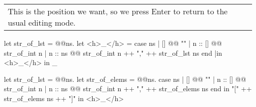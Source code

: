 \documentclass[runningheads]{llncs}
\begin{document}
	\begin{tabular}{|p{\linewidth}}
	This is the position we want, so we press Enter to return to
	the usual editing mode.
	\end{tabular}
\begin{hazel}
let str_of_lst = 
	@\lam @ns.{
		let <h>_</h> =
			case ns
			| []      @\casearrow @ ""
			| n :: [] @\casearrow @ str_of_int n		
			| n :: ns @\casearrow @ str_of_int n ++ "," ++ str_of_lst ns
			end
		|in
		<h>_</h>
	}
in
_
\end{hazel}

\begin{hazel}
let str_of_lst =
	@\lam @ns.{
		let str_of_elems = 
			@\lam @ns.{
				case ns
				| []      @\casearrow @ ""                                     
				| n :: [] @\casearrow @ str_of_int n                           
				| n :: ns @\casearrow @ str_of_int n ++ "," ++ str_of_elems ns 
				end
			}
		in
		"[" ++ str_of_elems ns ++ "]"
	}
in
<h>_</h>
\end{hazel}


%	
%
\end{document}
